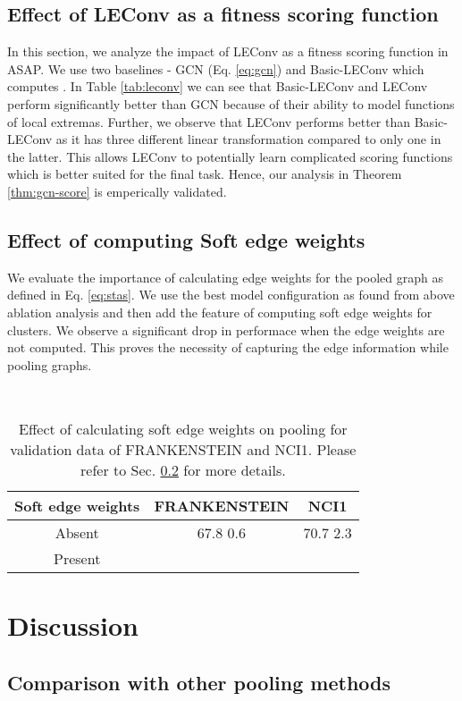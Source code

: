 \documentclass[letterpaper]{article} \usepackage{aaai20}  \usepackage{times}  \usepackage{helvet} \usepackage{courier}  \usepackage[hyphens]{url}  \usepackage{graphicx} \urlstyle{rm} \def\UrlFont{\rm}  \usepackage{graphicx}  \frenchspacing  \setlength{\pdfpagewidth}{8.5in}  \setlength{\pdfpageheight}{11in}
\begin{document}
\subsection{Effect of LEConv as a fitness scoring function}
\label{sec:ablation_fitness}
In this section, we analyze the impact of LEConv as a fitness scoring function in ASAP. We use two baselines - GCN (Eq. \ref{eq:gcn}) and Basic-LEConv which computes . In Table \ref{tab:leconv} we can see that Basic-LEConv and LEConv perform significantly better than GCN because of their ability to model functions of local extremas. Further, we observe that LEConv performs better than Basic-LEConv as it has three different linear transformation compared to only one in the latter. This allows LEConv to potentially learn complicated scoring functions which is better suited for the final task. Hence, our analysis in Theorem \ref{thm:gcn-score} is emperically validated.


\subsection{Effect of computing Soft edge weights}
\label{sec:ablation_edge}
We evaluate the importance of calculating edge weights for the pooled graph as defined in Eq. \ref{eq:stas}. We use the best model configuration as found from above ablation analysis and then add the feature of computing soft edge weights for clusters. We observe a significant drop in performace when the edge weights are not computed. This proves the necessity of capturing the edge information while pooling graphs.

\begin{table}[!tbh]\
	\centering
	\begin{tabular}{ccc}
		\toprule
		Soft edge weights & \textsc{FRANKENSTEIN} & \textsc{NCI1} \\
		\midrule
		Absent & 67.8  0.6 & 70.7  2.3 \\
		Present &  & \\
		\bottomrule
	\end{tabular}
	\caption{\label{tab:stas} Effect of calculating soft edge weights on pooling for validation data of FRANKENSTEIN and NCI1. Please refer to Sec. \ref{sec:ablation_edge} for more details.}
\end{table} 
\section{Discussion}


\subsection{Comparison with other pooling methods}
\label{sec:discussion_comp}
\end{document}
